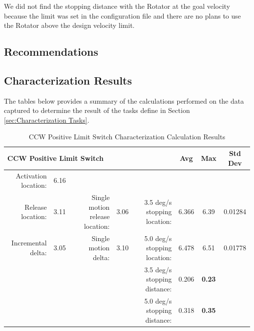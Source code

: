 \documentclass[SE,lsstdraft,authoryear,toc]{lsstdoc}
\begin{document}
We did not find the stopping distance with the Rotator at the goal
velocity because the limit was set in the configuration file and there
are no plans to use the Rotator above the design velocity limit.

\begin{landscape}
\section{Recommendations}

\subsection{Characterization Results}

The tables below provides a summary of the calculations performed on the
data captured to determine the result of the tasks define in Section \ref{sec:Characterization Tasks}.

\begin{table}[h!]
  \begin{center}
    \caption{CCW Positive Limit Switch Characterization Calculation Results}
    \label{tab:table1}
    \begin{tabular}{r|c|r|c|r|c|c|c}
    \multicolumn{5}{l|}{\textbf{CCW Positive Limit Switch}} & Avg & Max & Std Dev\\
    \midrule
    Activation location: & 6.16 & & & & & & \\
    Release location: & 3.11 & Single motion release location: & 3.06 & 3.5
    deg/s stopping location: & 6.366 & 6.39 & 0.01284 \\
    Incremental delta: & 3.05 & Single motion delta: & 3.10 & 5.0 deg/s
    stopping location: & 6.478 & 6.51 & 0.01778 \\
    & & & & 3.5 deg/s stopping distance: & 0.206 & \textbf{0.23} & \\
    & & & & 5.0 deg/s stopping distance: & 0.318 & \textbf{0.35} & \\
    \end{tabular}
  \end{center}
\end{table}


\end{landscape}
\end{document}
